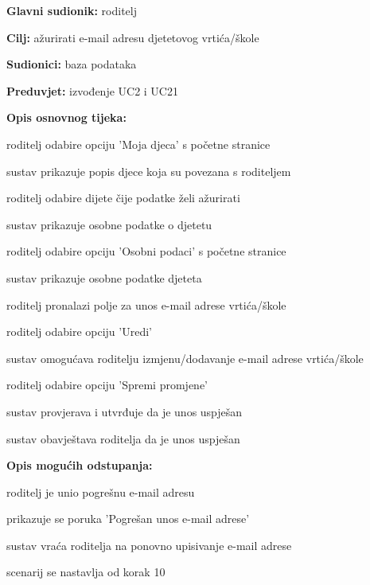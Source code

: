 					\noindent {}
					\begin{packed_item}
	
						\item \textbf{Glavni sudionik: }roditelj
						\item  \textbf{Cilj:} ažurirati e-mail adresu djetetovog vrtića/škole
						\item  \textbf{Sudionici:} baza podataka
						\item  \textbf{Preduvjet:} izvođenje UC2 i UC21
						\item  \textbf{Opis osnovnog tijeka:}
						
						\item[] \begin{packed_enum}
							\item roditelj odabire opciju 'Moja djeca' s početne stranice
							\item sustav prikazuje popis djece koja su povezana s roditeljem
							\item roditelj odabire dijete čije podatke želi ažurirati
							\item sustav prikazuje osobne podatke o djetetu
							\item roditelj odabire opciju 'Osobni podaci' s početne stranice
							\item sustav prikazuje osobne podatke djeteta
							\item roditelj pronalazi polje za unos e-mail adrese vrtića/škole
							\item roditelj odabire opciju 'Uredi'
							\item sustav omogućava roditelju izmjenu/dodavanje e-mail adrese vrtića/škole
							\item roditelj odabire opciju 'Spremi promjene'
							\item sustav provjerava i utvrđuje da je unos uspješan
							\item sustav obavještava roditelja da je unos uspješan
			
						\end{packed_enum}
						
						\item  \textbf{Opis mogućih odstupanja:}
						
						\item[] \begin{packed_item}
							\item[11.a] roditelj je unio pogrešnu e-mail adresu 
							\item[] 
							\begin{packed_enum} 
								\item prikazuje se poruka 'Pogrešan unos e-mail adrese'
								\item sustav vraća roditelja na ponovno upisivanje e-mail adrese
								\item scenarij se nastavlja od korak 10
								
							\end{packed_enum}
						\end{packed_item}
						
					\end{packed_item}



